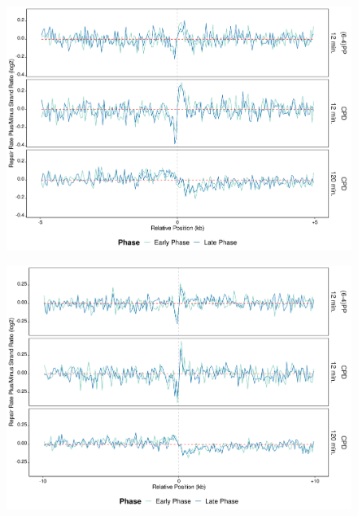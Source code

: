 \begin{figure}[H]
\begin{center}
\includegraphics[width=\textwidth]{Chapters/7_appendix/figures/supfig59}
\caption[]{}
\label{supfig:}
\end{center}
\end{figure}

\begin{figure}[H]
\begin{center}
\includegraphics[width=\textwidth]{Chapters/7_appendix/figures/supfig60}
\caption[]{}
\label{supfig:}
\end{center}
\end{figure}

